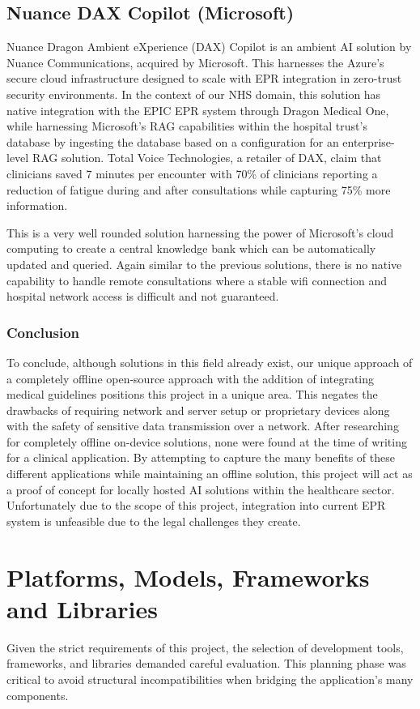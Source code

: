\subsection{Nuance DAX Copilot (Microsoft)}
Nuance Dragon Ambient eXperience (DAX) Copilot is an ambient AI solution by Nuance Communications, acquired by Microsoft. This harnesses the Azure's secure cloud infrastructure designed to scale with EPR integration in zero-trust security environments. In the context of our NHS domain, this solution has native integration with the EPIC EPR system through Dragon Medical One, while harnessing Microsoft's RAG capabilities within the hospital trust's database by ingesting the database based on a configuration for an enterprise-level RAG solution\cite{dictationdirect_dax_features_2026}. Total Voice Technologies, a retailer of DAX, claim that clinicians saved 7 minutes per encounter with 70\% of clinicians reporting a reduction of fatigue during and after consultations while capturing 75\% more information\cite{totalvoicetech_dax_2026}.

This is a very well rounded solution harnessing the power of Microsoft's cloud computing to create a central knowledge bank which can be automatically updated and queried. Again similar to the previous solutions, there is no native capability to handle remote consultations where a stable wifi connection and hospital network access is difficult and not guaranteed.

\subsubsection{Conclusion}
To conclude, although solutions in this field already exist, our unique approach of a completely offline open-source approach with the addition of integrating medical guidelines positions this project in a unique area. This negates the drawbacks of requiring network and server setup or proprietary devices along with the safety of sensitive data transmission over a network. After researching for completely offline on-device solutions, none were found at the time of writing for a clinical application. By attempting to capture the many benefits of these different applications while maintaining an offline solution, this project will act as a proof of concept for locally hosted AI solutions within the healthcare sector. Unfortunately due to the scope of this project, integration into current EPR system is unfeasible due to the legal challenges they create.

\section{Platforms, Models, Frameworks and Libraries}
Given the strict requirements of this project, the selection of development tools, frameworks, and libraries demanded careful evaluation. This planning phase was critical to avoid structural incompatibilities when bridging the application's many components. 

